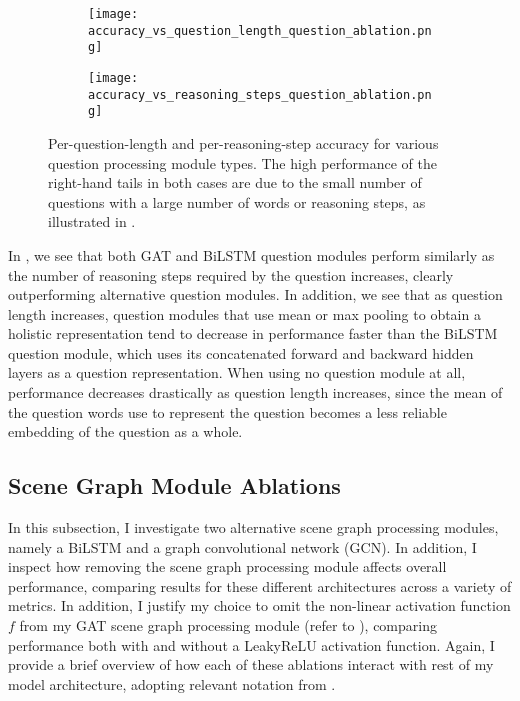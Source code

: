 \begin{figure}[htbp]
    \centering
    \begin{subfigure}[l]{0.5\textwidth}
        \texttt{[image: accuracy\_vs\_question\_length\_question\_ablation.png]}
        \label{fig:accuracy_vs_question_length_question_ablation}
    \end{subfigure}
    \begin{subfigure}[r]{0.49\textwidth}
        \texttt{[image: accuracy\_vs\_reasoning\_steps\_question\_ablation.png]}
        \label{fig:accuracy_vs_reasoning_steps_question_ablation}
    \end{subfigure}
    \caption{Per-question-length and per-reasoning-step accuracy for various question processing module types. The high performance of the right-hand tails in both cases are due to the small number of questions with a large number of words or reasoning steps, as illustrated in \figureautorefname{ \ref{fig:test_reasoning_step_and_question_length_distribution}}.}
    \label{fig:accuracy_vs_question_length_and_reasoning_steps_question_ablation}
\end{figure}

In \figureautorefname{ \ref{fig:accuracy_vs_question_length_and_reasoning_steps_question_ablation}}, we see that both GAT and BiLSTM question modules perform similarly as the number of reasoning steps required by the question increases, clearly outperforming alternative question modules. In addition, we see that as question length increases, question modules that use mean or max pooling to obtain a holistic representation tend to decrease in performance faster than the BiLSTM question module, which uses its concatenated forward and backward hidden layers as a question representation. When using no question module at all, performance decreases drastically as question length increases, since the mean of the question words use to represent the question becomes a less reliable embedding of the question as a whole.

\subsection{Scene Graph Module Ablations}
\label{subsec:scene_graph_module_ablations}

In this subsection, I investigate two alternative scene graph processing modules, namely a BiLSTM and a graph convolutional network (GCN). In addition, I inspect how removing the scene graph processing module affects overall performance, comparing results for these different architectures across a variety of metrics. In addition, I justify my choice to omit the non-linear activation function \(f\) from my GAT scene graph processing module (refer to \equationautorefname{ \ref{equation:gat_propagation_rule}}), comparing performance both with and without a LeakyReLU activation function. Again, I provide a brief overview of how each of these ablations interact with rest of my model architecture, adopting relevant notation from \chapterautorefname{ \ref{chapter:methodology}}.

